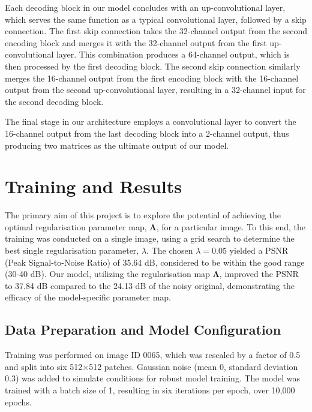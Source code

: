 \documentclass[12pt]{article}
\begin{document}
Each decoding block in our model concludes with an up-convolutional layer, which serves the same function as a typical convolutional layer, followed by a skip connection. The first skip connection takes the 32-channel output from the second encoding block and merges it with the 32-channel output from the first up-convolutional layer. This combination produces a 64-channel output, which is then processed by the first decoding block. The second skip connection similarly merges the 16-channel output from the first encoding block with the 16-channel output from the second up-convolutional layer, resulting in a 32-channel input for the second decoding block.

The final stage in our architecture employs a convolutional layer to convert the 16-channel output from the last decoding block into a 2-channel output, thus producing two matrices as the ultimate output of our model.



\section{Training and Results}


The primary aim of this project is to explore the potential of achieving the optimal regularisation parameter map, $\mathbf{\Lambda}$, for a particular image. To this end, the training was conducted on a single image, using a grid search to determine the best single regularisation parameter, $\lambda$. The chosen $\lambda = 0.05$ yielded a PSNR (Peak Signal-to-Noise Ratio) of 35.64 dB, considered to be within the good range (30-40 dB). Our model, utilizing the regularisation map $\mathbf{\Lambda}$, improved the PSNR to 37.84 dB compared to the 24.13 dB of the noisy original, demonstrating the efficacy of the model-specific parameter map.

\subsection{Data Preparation and Model Configuration}

Training was performed on image ID 0065, which was rescaled by a factor of 0.5 and split into six 512$\times$512 patches. Gaussian noise (mean 0, standard deviation 0.3) was added to simulate conditions for robust model training. The model was trained with a batch size of 1, resulting in six iterations per epoch, over 10,000 epochs.
\end{document}
